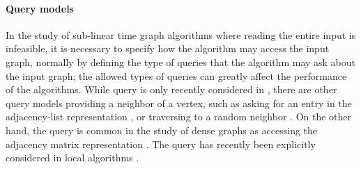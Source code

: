 \paragraph*{Query models}
In the study of sub-linear time graph algorithms where reading the entire input is infeasible,
it is necessary to specify how the algorithm may access the input graph,
normally by defining the type of queries that the algorithm may ask about the input graph;
the allowed types of queries 
can greatly affect the performance of the algorithms.
While  query is only recently considered in \cite{reut},
there are other query models providing a neighbor of a vertex,
such as asking for an entry in the adjacency-list representation \cite{goldreich1997property},
or traversing to a random neighbor \cite{brautbar2010local}. On the other hand,
the
 query is common in the study of dense graphs as accessing the adjacency matrix representation \cite{goldreich1998property}.
The  query has recently been explicitly considered in local algorithms \cite{feige2017probe}.
